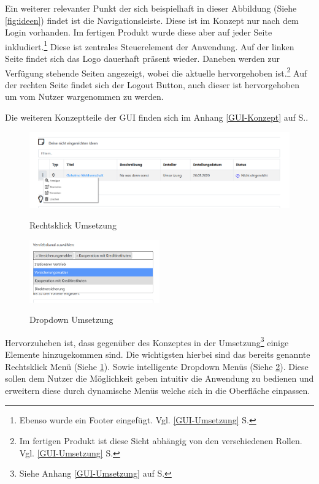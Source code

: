 Ein weiterer relevanter Punkt der sich beispielhaft in dieser Abbildung (Siehe \cref{fig:ideen}) findet ist die Navigationsleiste. Diese ist im Konzept nur nach dem Login vorhanden. Im fertigen Produkt wurde diese aber auf jeder Seite inkludiert.\footnote{Ebenso wurde ein Footer eingefügt. Vgl. \ref{GUI-Umsetzung} S.\pageref{GUI-Umsetzung}}
Diese ist zentrales Steuerelement der Anwendung. Auf der linken Seite findet sich das Logo dauerhaft präsent wieder. Daneben werden zur Verfügung stehende Seiten angezeigt, wobei die aktuelle hervorgehoben ist.\footnote{Im fertigen Produkt ist diese Sicht abhängig von den verschiedenen Rollen. Vgl. \ref{GUI-Umsetzung} S.\pageref{GUI-Umsetzung}} Auf der rechten Seite findet sich der Logout Button, auch dieser ist hervorgehoben um vom Nutzer wargenommen zu werden.

Die weiteren Konzeptteile der GUI finden sich im Anhang \ref{GUI-Konzept} auf S.\pageref{GUI-Konzept}.

\begin{figure}[hbt]
\centering
\begin{minipage}[t]{1\textwidth}
    \caption{Rechtsklick Umsetzung}
    \includegraphics[width=1\textwidth]{img/rechtsklick-umsetzung.png}\\
    \label{fig:rechtsklick}
\end{minipage}
\end{figure}

\begin{figure}[hbt]
\centering
\begin{minipage}[t]{1\textwidth}
    \caption{Dropdown Umsetzung}
    \includegraphics[width=0.5\textwidth]{img/dropdown-umsetzung.png}\\
    \label{fig:dropdown}
\end{minipage}
\end{figure}

Hervorzuheben ist, dass gegenüber des Konzeptes in der Umsetzung\footnote{Siehe Anhang \ref{GUI-Umsetzung} auf S.\pageref{GUI-Umsetzung}} einige Elemente hinzugekommen sind. Die wichtigsten hierbei sind das bereits genannte Rechtsklick Menü (Siehe \cref{fig:rechtsklick}). Sowie intelligente Dropdown Menüs (Siehe \cref{fig:dropdown}).
Diese sollen dem Nutzer die Möglichkeit geben intuitiv die Anwendung zu bedienen und erweitern diese durch dynamische Menüs welche sich in die Oberfläche einpassen.
